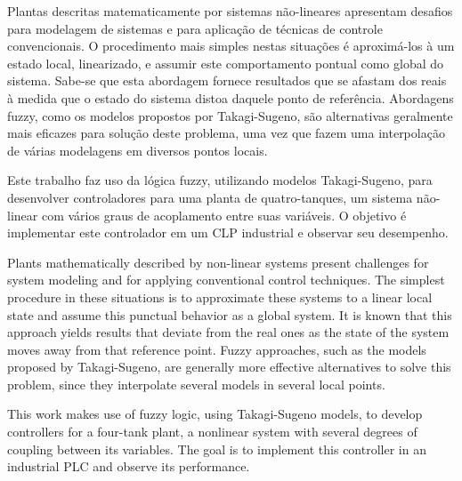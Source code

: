 %
{
	\indent Plantas descritas matematicamente por sistemas não-lineares apresentam desafios para modelagem de sistemas e para aplicação de técnicas de controle convencionais. O procedimento mais simples nestas situações é aproximá-los à um estado local, linearizado, e assumir este comportamento pontual como global do sistema. Sabe-se que esta abordagem fornece resultados que se afastam dos reais à medida que o estado do sistema distoa daquele ponto de referência. Abordagens fuzzy, como os modelos propostos por Takagi-Sugeno, são alternativas geralmente mais eficazes para solução deste problema, uma vez que fazem uma interpolação de várias modelagens em diversos pontos locais.
	
	Este trabalho faz uso da lógica fuzzy, utilizando modelos Takagi-Sugeno, para desenvolver controladores para uma planta de quatro-tanques, um sistema não-linear com vários graus de acoplamento entre suas variáveis. O objetivo é implementar este controlador em um CLP industrial e observar seu desempenho.
}
\vspace*{2cm}
{
	\indent Plants mathematically described by non-linear systems present challenges for system modeling and for applying conventional control techniques. The simplest procedure in these situations is to approximate these systems to a linear local state and assume this punctual behavior as a global system. It is known that this approach yields results that deviate from the real ones as the state of the system moves away from that reference point. Fuzzy approaches, such as the models proposed by Takagi-Sugeno, are generally more effective alternatives to solve this problem, since they interpolate several models in several local points.
	
	This work makes use of fuzzy logic, using Takagi-Sugeno models, to develop controllers for a four-tank plant, a nonlinear system with several degrees of coupling between its variables. The goal is to implement this controller in an industrial PLC and observe its performance.
}%

